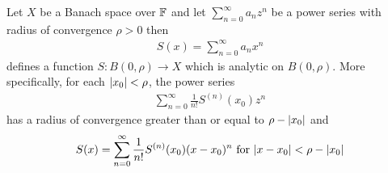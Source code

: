 \begin{prop}\label{banach:ConvergentPowerSeriesAreAnalytic}Let $X$ be a Banach space over $\mathbb{F}$ and let $\sum_{n=0}^\infty a_n z^n$ be a power series with radius of convergence $\rho >0$ then
  \begin{align*}
    S(x) = \sum_{n=0}^\infty a_n x^n
  \end{align*}
  defines a function  $S : B(0, \rho) \to X$ which is analytic on $B(0, \rho)$.  More specifically, for each $\left \vert x_0 \right \vert < \rho$, the power series
  \begin{align*}
    \sum_{n=0}^\infty \frac{1}{n!} S^{(n)}(x_0) z^n
  \end{align*}
  has a radius of convergence greater than or equal to $\rho - \left \vert x_0 \right \vert$ and
  \begin{align*}
    S(x) = \sum_{n=0}^\infty \frac{1}{n!} S^{(n)}(x_0) (x - x_0)^n \text{ for $\left \vert x - x_0 \right \vert < \rho - \left \vert x_0 \right \vert$}
  \end{align*}
\end{prop}
